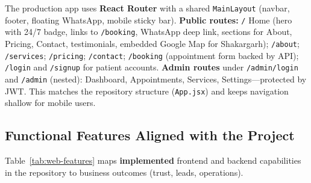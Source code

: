 \documentclass[12pt, a4paper]{article}
\begin{document}
The production app uses \textbf{React Router} with a shared \texttt{MainLayout} (navbar, footer, floating WhatsApp, mobile sticky bar). \textbf{Public routes:} \texttt{/} Home (hero with 24/7 badge, links to \texttt{/booking}, WhatsApp deep link, sections for About, Pricing, Contact, testimonials, embedded Google Map for Shakargarh); \texttt{/about}; \texttt{/services}; \texttt{/pricing}; \texttt{/contact}; \texttt{/booking} (appointment form backed by API); \texttt{/login} and \texttt{/signup} for patient accounts. \textbf{Admin routes} under \texttt{/admin/login} and \texttt{/admin} (nested): Dashboard, Appointments, Services, Settings---protected by JWT. This matches the repository structure (\texttt{App.jsx}) and keeps navigation shallow for mobile users.

\subsection{Functional Features Aligned with the Project}

Table~\ref{tab:web-features} maps \textbf{implemented} frontend and backend capabilities in the repository to business outcomes (trust, leads, operations).
\end{document}
